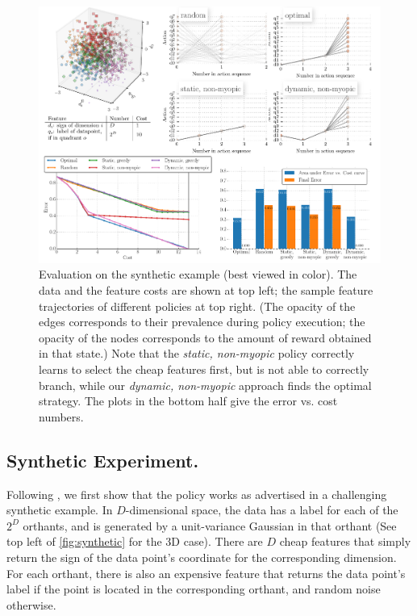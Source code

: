 \begin{figure}[ht]
\centering
\includegraphics[width=.9\textwidth]{../../figures/synthetic.pdf}
\caption{
Evaluation on the synthetic example (best viewed in color).
The data and the feature costs are shown at top left; the sample feature trajectories of different policies at top right.
(The opacity of the edges corresponds to their prevalence during policy execution; the opacity of the nodes corresponds to the amount of reward obtained in that state.)
Note that the \emph{static, non-myopic} policy correctly learns to select the cheap features first, but is not able to correctly branch, while our \emph{dynamic, non-myopic} approach finds the optimal strategy.
The plots in the bottom half give the error vs. cost numbers.
}

\label{fig:synthetic}
\end{figure}

\subsection{Synthetic Experiment.}
Following \parencite{Xu-ICML-2013}, we first show that the policy works as advertised in a challenging synthetic example.
In $D$-dimensional space, the data has a label for each of the $2^D$ orthants, and is generated by a unit-variance Gaussian in that orthant (See top left of \autoref{fig:synthetic} for the 3D case).
There are $D$ cheap features that simply return the sign of the data point's coordinate for the corresponding dimension.
For each orthant, there is also an expensive feature that returns the data point's label if the point is located in the corresponding orthant, and random noise otherwise.

